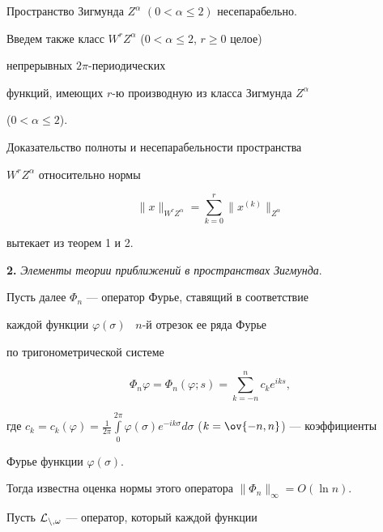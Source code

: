  


\begin{thm} 


Пространство Зигмунда $Z^\alpha$ $(0<\alpha\le2)$ несепарабельно. 


\end{thm} 


 


Введем также класс $W^r Z^\alpha$ ($0<\alpha\le2$, $r\ge0$ целое) 


непрерывных $2\pi$-периодических 


функций, имеющих $r$-ю производную из класса Зигмунда $Z^\alpha$ 


($0<\alpha\le2$). 


Доказательство полноты и несепарабельности пространства 


$W^r Z^\alpha$ относительно нормы 


$$ 


\|x\|_{W^r Z^\alpha}=\sum^r_{k=0}\|x^{(k)}\|_{Z^\alpha} 


$$ 


вытекает из теорем 1 и 2. 


\medskip 


 


{\bf 2.} {\it Элементы теории приближений в пространствах Зигмунда}. 


Пусть далее $\Phi_n$ --- оператор Фурье, ставящий в соответствие 


каждой функции $\varphi(\sigma)$ \ $n$-й отрезок ее ряда Фурье 


по тригонометрической системе 


$$ 


\Phi_n\varphi=\Phi_n(\varphi;s)=\sum^n_{k=-n} 


c_k e^{iks}, 


$$ 


где $c_k=c_k(\varphi)=\frac{1}{2\pi}\int\limits^{2\pi}_0 


\varphi(\sigma)e^{-ik\sigma}d\sigma$ ($k=\ov{-n,n}$) --- коэффициенты 


Фурье функции $\varphi(\sigma)$. 


Тогда известна оценка нормы этого оператора $\|\Phi_n\|_\infty=O(\ln 


n)$. 


 


Пусть $\cal L_{n,\omega}$ --- оператор, который каждой функции 


